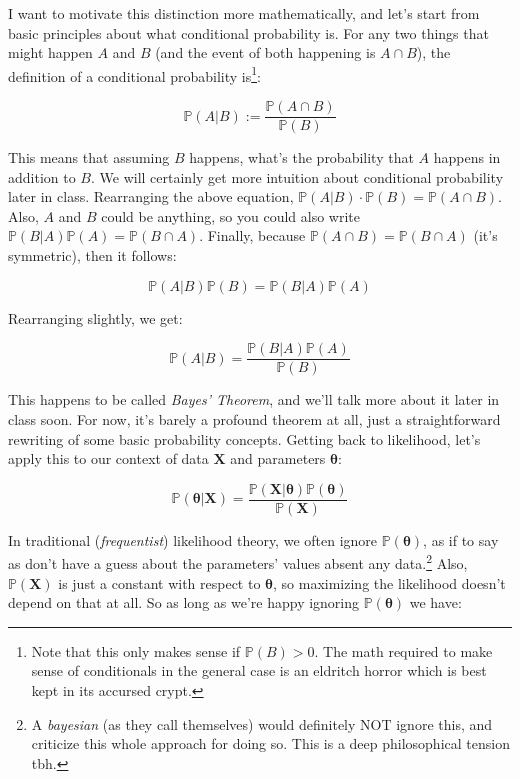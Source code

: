 \documentclass{article}
\begin{document}
I want to motivate this distinction more mathematically, and let's start from basic principles about what conditional probability is. For any two things that might happen $A$ and $B$ (and the event of both happening is $A\cap B$), the definition of a conditional probability is\footnote{Note that this only makes sense if $\mathbb{P}(B)>0$. The math required to make sense of conditionals in the general case is an eldritch horror which is best kept in its accursed crypt.}:

\begin{equation}
\mathbb{P}(A|B) := \frac{\mathbb{P}(A \cap B)}{\mathbb{P}(B)}
\end{equation}

\newpage
This means that assuming $B$ happens, what's the probability that $A$ happens in addition to $B$. We will certainly get more intuition about conditional probability later in class. Rearranging the above equation, $\mathbb{P}(A|B)\cdot\mathbb{P}(B) = \mathbb{P}(A \cap B)$. Also, $A$ and $B$ could be anything, so you could also write $\mathbb{P}(B|A)\mathbb{P}(A) = \mathbb{P}(B \cap A)$. Finally, because $\mathbb{P}(A \cap B)=\mathbb{P}(B \cap A)$ (it's symmetric), then it follows:

\begin{equation}
\mathbb{P}(A|B)\mathbb{P}(B) = \mathbb{P}(B|A)\mathbb{P}(A)
\end{equation}

Rearranging slightly, we get:

\begin{equation}
\mathbb{P}(A|B) = \frac{\mathbb{P}(B|A)\mathbb{P}(A)}{\mathbb{P}(B)}
\end{equation}

This happens to be called \textit{Bayes' Theorem}, and we'll talk more about it later in class soon. For now, it's barely a profound theorem at all, just a straightforward rewriting of some basic probability concepts. Getting back to likelihood, let's apply this to our context of data $\textbf{X}$ and parameters $\boldsymbol{\theta}$:

\begin{equation}
\mathbb{P}(\boldsymbol{\theta}|\textbf{X}) = \frac{\mathbb{P}(\textbf{X}|\boldsymbol{\theta})\mathbb{P}(\boldsymbol{\theta})}{\mathbb{P}(\textbf{X})}
\end{equation}

In traditional (\textit{frequentist}) likelihood theory, we often ignore $\mathbb{P}(\boldsymbol{\theta})$, as if to say as don't have a guess about the parameters' values absent any data.\footnote{A \textit{bayesian} (as they call themselves) would definitely NOT ignore this, and criticize this whole approach for doing so. This is a deep philosophical tension tbh.} Also, $\mathbb{P}(\mathbf{X})$ is just a constant with respect to $\boldsymbol{\theta}$, so maximizing the likelihood doesn't depend on that at all. So as long as we're happy ignoring $\mathbb{P}(\boldsymbol{\theta})$ we have:
\end{document}
